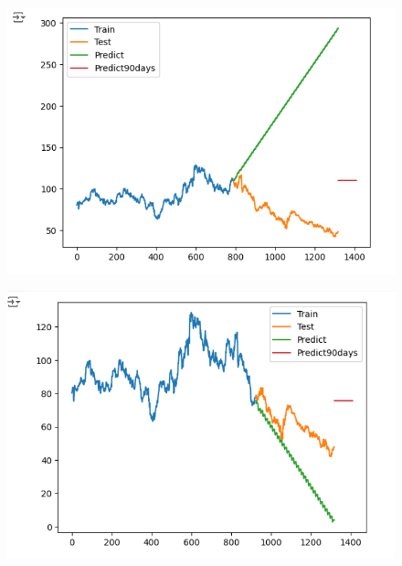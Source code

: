 \documentclass{article}
\begin{document}
\begin{multicols}{2}
\begin{figure}[H]
    \centering
    \begin{minipage}{0.15\textwidth}
    \centering
    \includegraphics[width=1\textwidth]{Image/ARIMA/90_6_4_SONY_Arima.png}
   
    \label{fig:1}
    \end{minipage}%
    \begin{minipage}{0.15\textwidth}
    \centering
    \includegraphics[width=1\textwidth]{Image/ARIMA/90_7_3_SONY_Arima.png}
  

\end{minipage}
\end{figure}
\end{multicols}
\end{document}

